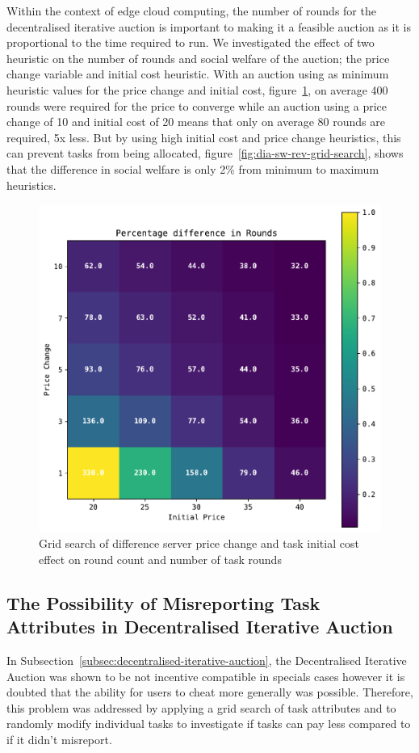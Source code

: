 Within the context of edge cloud computing, the number of rounds for the decentralised iterative auction is important
to making it a feasible auction as it is proportional to the time required to run. We investigated the effect of two
heuristic on the number of rounds and social welfare of the auction; the price change variable and initial cost
heuristic. With an auction using as minimum heuristic values for the price change and initial cost,
figure~\ref{fig:dia-rounds-grid-search}, on average 400 rounds were required for the price to converge while an auction
using a price change of 10 and initial cost of 20 means that only on average 80 rounds are required, 5x less. But by
using high initial cost and price change heuristics, this can prevent tasks from being allocated,
figure~\ref{fig:dia-sw-rev-grid-search}, shows that the difference in social welfare is only 2\% from minimum to
maximum heuristics.

\begin{figure}[h]
    \centering
    \includegraphics[width=0.45\linewidth]{figs/dia_heuristics/rounds_grid.pdf}
    \caption{Grid search of difference server price change and task initial cost effect on round count and number of
             task rounds}
    \label{fig:dia-rounds-grid-search}
\end{figure}

\subsection{The Possibility of Misreporting Task Attributes in Decentralised Iterative Auction}
\label{subsec:possibility-of-misreporting-task-attributes-in-decentarlised-iterative-auction}
In Subsection~\ref{subsec:decentralised-iterative-auction}, the Decentralised Iterative Auction was shown to be not
incentive compatible in specials cases however it is doubted that the ability for users to cheat more generally was
possible. Therefore, this problem was addressed by applying a grid search of task attributes and to randomly modify
individual tasks to investigate if tasks can pay less compared to if it didn't misreport.

